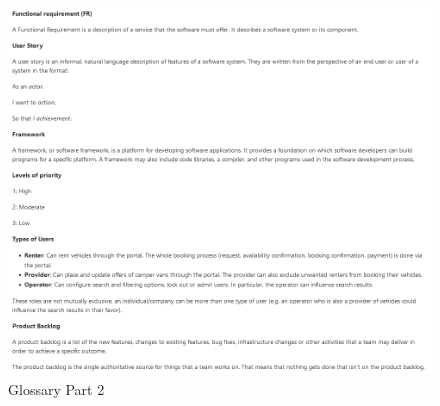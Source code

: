 \begin{figure}[h]
	\centering
	\includegraphics[width=15cm]{resources/images/glossary_2.png}
	\caption{Glossary Part 2}
	\label{fig:glossary_2}
\end{figure}

